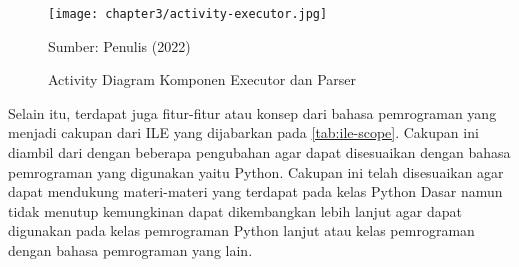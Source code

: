 \begin{figure}[H]
  \centering
  \texttt{[image: chapter3/activity-executor.jpg]}
  \caption{Activity Diagram Komponen Executor dan Parser} \label{fig:activity-executor}
  Sumber: Penulis (2022)
\end{figure}

Selain itu, terdapat juga fitur-fitur atau konsep dari bahasa pemrograman yang menjadi cakupan dari ILE yang dijabarkan pada \autoref{tab:ile-scope}. Cakupan ini diambil dari \textcite{moons2013pilot} dengan beberapa pengubahan agar dapat disesuaikan dengan bahasa pemrograman yang digunakan yaitu Python. Cakupan ini telah disesuaikan agar dapat mendukung materi-materi yang terdapat pada kelas Python Dasar namun tidak menutup kemungkinan dapat dikembangkan lebih lanjut agar dapat digunakan pada kelas pemrograman Python lanjut atau kelas pemrograman dengan bahasa pemrograman yang lain.

